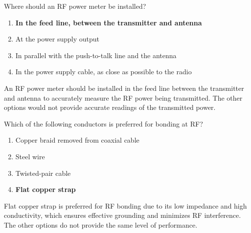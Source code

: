 \begin{tcolorbox}[colback=gray!10!white,colframe=black!75!black,title={T4A05}]
    Where should an RF power meter be installed?
    \begin{enumerate}[label=\Alph*,noitemsep]
        \item \textbf{In the feed line, between the transmitter and antenna}
        \item At the power supply output
        \item In parallel with the push-to-talk line and the antenna
        \item In the power supply cable, as close as possible to the radio
    \end{enumerate}
\end{tcolorbox}
An RF power meter should be installed in the feed line between the transmitter and antenna to accurately measure the RF power being transmitted. The other options would not provide accurate readings of the transmitted power.


\begin{tcolorbox}[colback=gray!10!white,colframe=black!75!black,title={T4A08}]
    Which of the following conductors is preferred for bonding at RF?
    \begin{enumerate}[label=\Alph*,noitemsep]
        \item Copper braid removed from coaxial cable
        \item Steel wire
        \item Twisted-pair cable
        \item \textbf{Flat copper strap}
    \end{enumerate}
\end{tcolorbox}
Flat copper strap is preferred for RF bonding due to its low impedance and high conductivity, which ensures effective grounding and minimizes RF interference. The other options do not provide the same level of performance.


